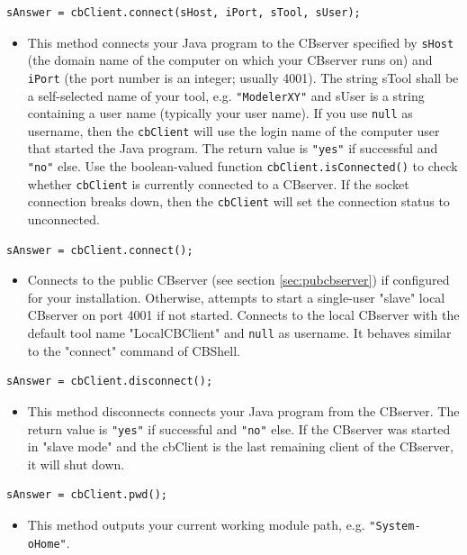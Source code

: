 \begin{verbatim}
sAnswer = cbClient.connect(sHost, iPort, sTool, sUser);
\end{verbatim}

\begin{itemize}
\item This method connects your Java program to the CBserver specified by {\tt sHost} (the domain
name of the computer on which your CBserver runs on) and {\tt iPort} (the port number is 
an integer; usually 4001). The string sTool shall be a self-selected name of your
tool, e.g. {\tt "ModelerXY"} and sUser is a string containing a user name (typically your
user name). If you use {\tt null} as username, then the {\tt cbClient} will use the
login name of the computer user that started the Java program.
The return value is {\tt "yes"} if successful and {\tt "no"} else. Use the boolean-valued
function {\tt cbClient.isConnected()} to check whether {\tt cbClient} is currently
connected to a CBserver. If the socket connection breaks down, then the {\tt cbClient} will
set the connection status to unconnected.
\end{itemize}

\begin{verbatim}
sAnswer = cbClient.connect();
\end{verbatim}

\begin{itemize}
\item Connects to the public CBserver  (see section \ref{sec:pubcbserver})
if configured for your installation.
Otherwise, attempts to start a single-user "slave" local CBserver on port 4001 if not started.
Connects to the local CBserver with the default tool name "LocalCBClient" and {\tt null} as username.
It behaves similar to the "connect" command of CBShell.
\end{itemize}


\begin{verbatim}
sAnswer = cbClient.disconnect();
\end{verbatim}
\begin{itemize}
\item This method disconnects connects your Java program from the CBserver.
The return value is {\tt "yes"} if successful and {\tt "no"} else. If the CBserver was started in
"slave mode" and the cbClient is the last remaining client of the CBserver, it will shut down.
\end{itemize}

\begin{verbatim}
sAnswer = cbClient.pwd();
\end{verbatim}
\begin{itemize}
\item This method outputs your current working module path, e.g. {\tt "System-oHome"}.
\end{itemize}

